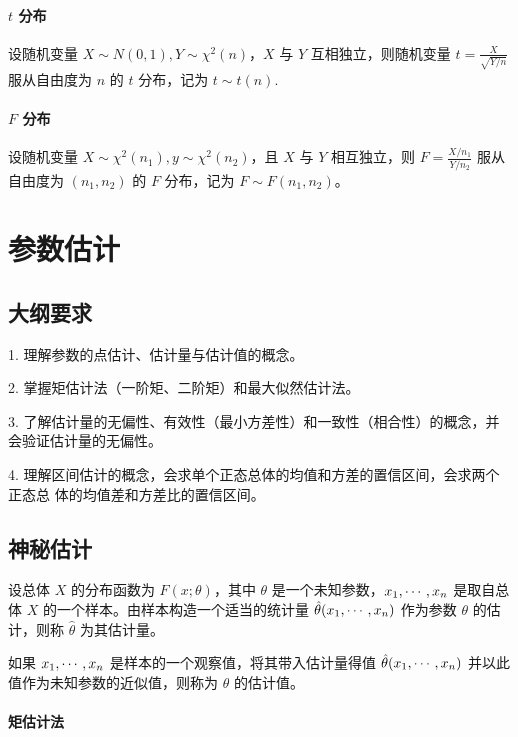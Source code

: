 \paragraph{$t$ 分布}

设随机变量 $X \sim N(0, 1), Y \sim \chi^2(n)$，$X$ 与 $Y$ 互相独立，则随机变量 $t = \frac{X}{\sqrt{Y / n}}$ 服从自由度为 $n$ 的 $t$ 分布，记为 $t \sim t(n)$.

\paragraph{$F$ 分布}

设随机变量 $X \sim \chi^2(n_1), y \sim \chi^2(n_2)$，且 $X$ 与 $Y$ 相互独立，则 $F = \frac{X / n_1}{Y / n_2}$ 服从自由度为 $(n_1, n_2)$ 的 $F$ 分布，记为 $F \sim F(n_1, n_2)$。


\section{参数估计}

\subsection{大纲要求}

1. 理解参数的点估计、估计量与估计值的概念。

2. 掌握矩估计法（一阶矩、二阶矩）和最大似然估计法。

3. 了解估计量的无偏性、有效性（最小方差性）和一致性（相合性）的概念，并会验证估计量的无偏性。

4. 理解区间估计的概念，会求单个正态总体的均值和方差的置信区间，会求两个正态总
体的均值差和方差比的置信区间。

\subsection{神秘估计}

设总体 $X$ 的分布函数为 $F(x; \theta)$，其中 $\theta$ 是一个未知参数，$x_1,\cdots,x_n$ 是取自总体 $X$ 的一个样本。由样本构造一个适当的统计量 $\hat{\theta}(x_1,\cdots,x_n)$ 作为参数 $\theta$ 的估计，则称 $\hat{\theta}$ 为其估计量。

如果 $x_1,\cdots,x_n$ 是样本的一个观察值，将其带入估计量得值 $\hat{\theta}(x_1,\cdots,x_n)$ 并以此值作为未知参数的近似值，则称为 $\theta$ 的估计值。

\paragraph{矩估计法}

